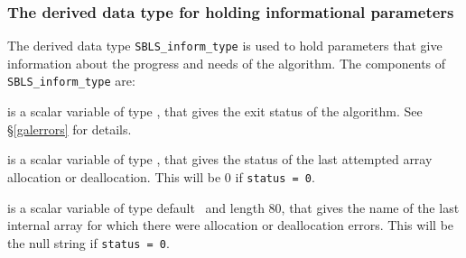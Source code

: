 \documentclass{galahad}
\newcommand{\packagename}{SBLS}
\begin{document}

\subsubsection{The derived data type for holding informational
 parameters}\label{typeinform}
The derived data type
{\tt \packagename\_inform\_type}
is used to hold parameters that give information about the progress and needs
of the algorithm. The components of
{\tt \packagename\_inform\_type}
are:

\begin{description}

 is a scalar variable of type \integer, that gives the
exit status of the algorithm.
See \S\ref{galerrors}
for details.

 is a scalar variable of type \integer, that gives
the status of the last attempted array allocation or deallocation.
This will be 0 if {\tt status = 0}.

 is a scalar variable of type default \character\
and length 80, that  gives the name of the last internal array
for which there were allocation or deallocation errors.
This will be the null string if {\tt status = 0}.






\end{description}
\end{document}
